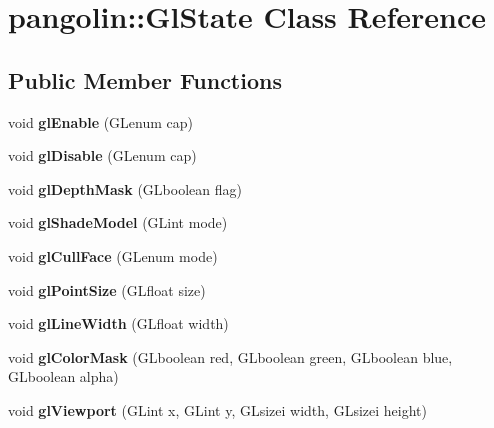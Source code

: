 \hypertarget{classpangolin_1_1_gl_state}{}\section{pangolin\+:\+:Gl\+State Class Reference}
\label{classpangolin_1_1_gl_state}
\subsection*{Public Member Functions}
\begin{DoxyCompactItemize}
\item 
void {\bfseries gl\+Enable} (G\+Lenum cap)\hypertarget{classpangolin_1_1_gl_state_acbab4ce959bb3a21e89833a3395cb767}{}\label{classpangolin_1_1_gl_state_acbab4ce959bb3a21e89833a3395cb767}

\item 
void {\bfseries gl\+Disable} (G\+Lenum cap)\hypertarget{classpangolin_1_1_gl_state_a27249f592db3adc84725d2fa97906ffc}{}\label{classpangolin_1_1_gl_state_a27249f592db3adc84725d2fa97906ffc}

\item 
void {\bfseries gl\+Depth\+Mask} (G\+Lboolean flag)\hypertarget{classpangolin_1_1_gl_state_a546766c0bc813c5ee25cc1644170c583}{}\label{classpangolin_1_1_gl_state_a546766c0bc813c5ee25cc1644170c583}

\item 
void {\bfseries gl\+Shade\+Model} (G\+Lint mode)\hypertarget{classpangolin_1_1_gl_state_a83bc993d1685aa6717432a27d5527ea4}{}\label{classpangolin_1_1_gl_state_a83bc993d1685aa6717432a27d5527ea4}

\item 
void {\bfseries gl\+Cull\+Face} (G\+Lenum mode)\hypertarget{classpangolin_1_1_gl_state_a1a14835dd0236431983f1e84492eac72}{}\label{classpangolin_1_1_gl_state_a1a14835dd0236431983f1e84492eac72}

\item 
void {\bfseries gl\+Point\+Size} (G\+Lfloat size)\hypertarget{classpangolin_1_1_gl_state_ad89ff5be459d839e9876ec473c81791a}{}\label{classpangolin_1_1_gl_state_ad89ff5be459d839e9876ec473c81791a}

\item 
void {\bfseries gl\+Line\+Width} (G\+Lfloat width)\hypertarget{classpangolin_1_1_gl_state_ae7b13f1387b3c571b198d19d6779c16b}{}\label{classpangolin_1_1_gl_state_ae7b13f1387b3c571b198d19d6779c16b}

\item 
void {\bfseries gl\+Color\+Mask} (G\+Lboolean red, G\+Lboolean green, G\+Lboolean blue, G\+Lboolean alpha)\hypertarget{classpangolin_1_1_gl_state_adfc2b30467d7c506737406de44aa2ca5}{}\label{classpangolin_1_1_gl_state_adfc2b30467d7c506737406de44aa2ca5}

\item 
void {\bfseries gl\+Viewport} (G\+Lint x, G\+Lint y, G\+Lsizei width, G\+Lsizei height)\hypertarget{classpangolin_1_1_gl_state_a1445f136d0fc99dd011ff0680c2cabcf}{}\label{classpangolin_1_1_gl_state_a1445f136d0fc99dd011ff0680c2cabcf}

\end{DoxyCompactItemize}
